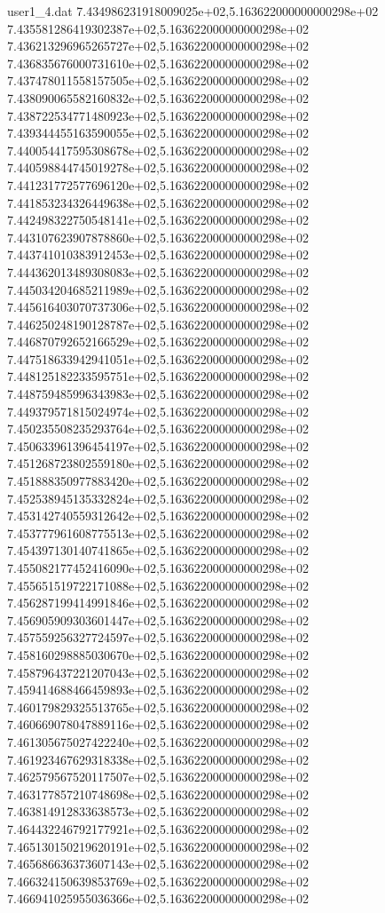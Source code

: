 \begin{filecontents}{user1_4.dat}
7.434986231918009025e+02,5.163622000000000298e+02
7.435581286419302387e+02,5.163622000000000298e+02
7.436213296965265727e+02,5.163622000000000298e+02
7.436835676000731610e+02,5.163622000000000298e+02
7.437478011558157505e+02,5.163622000000000298e+02
7.438090065582160832e+02,5.163622000000000298e+02
7.438722534771480923e+02,5.163622000000000298e+02
7.439344455163590055e+02,5.163622000000000298e+02
7.440054417595308678e+02,5.163622000000000298e+02
7.440598844745019278e+02,5.163622000000000298e+02
7.441231772577696120e+02,5.163622000000000298e+02
7.441853234326449638e+02,5.163622000000000298e+02
7.442498322750548141e+02,5.163622000000000298e+02
7.443107623907878860e+02,5.163622000000000298e+02
7.443741010383912453e+02,5.163622000000000298e+02
7.444362013489308083e+02,5.163622000000000298e+02
7.445034204685211989e+02,5.163622000000000298e+02
7.445616403070737306e+02,5.163622000000000298e+02
7.446250248190128787e+02,5.163622000000000298e+02
7.446870792652166529e+02,5.163622000000000298e+02
7.447518633942941051e+02,5.163622000000000298e+02
7.448125182233595751e+02,5.163622000000000298e+02
7.448759485996343983e+02,5.163622000000000298e+02
7.449379571815024974e+02,5.163622000000000298e+02
7.450235508235293764e+02,5.163622000000000298e+02
7.450633961396454197e+02,5.163622000000000298e+02
7.451268723802559180e+02,5.163622000000000298e+02
7.451888350977883420e+02,5.163622000000000298e+02
7.452538945135332824e+02,5.163622000000000298e+02
7.453142740559312642e+02,5.163622000000000298e+02
7.453777961608775513e+02,5.163622000000000298e+02
7.454397130140741865e+02,5.163622000000000298e+02
7.455082177452416090e+02,5.163622000000000298e+02
7.455651519722171088e+02,5.163622000000000298e+02
7.456287199414991846e+02,5.163622000000000298e+02
7.456905909303601447e+02,5.163622000000000298e+02
7.457559256327724597e+02,5.163622000000000298e+02
7.458160298885030670e+02,5.163622000000000298e+02
7.458796437221207043e+02,5.163622000000000298e+02
7.459414688466459893e+02,5.163622000000000298e+02
7.460179829325513765e+02,5.163622000000000298e+02
7.460669078047889116e+02,5.163622000000000298e+02
7.461305675027422240e+02,5.163622000000000298e+02
7.461923467629318338e+02,5.163622000000000298e+02
7.462579567520117507e+02,5.163622000000000298e+02
7.463177857210748698e+02,5.163622000000000298e+02
7.463814912833638573e+02,5.163622000000000298e+02
7.464432246792177921e+02,5.163622000000000298e+02
7.465130150219620191e+02,5.163622000000000298e+02
7.465686636373607143e+02,5.163622000000000298e+02
7.466324150639853769e+02,5.163622000000000298e+02
7.466941025955036366e+02,5.163622000000000298e+02

\end{filecontents}
